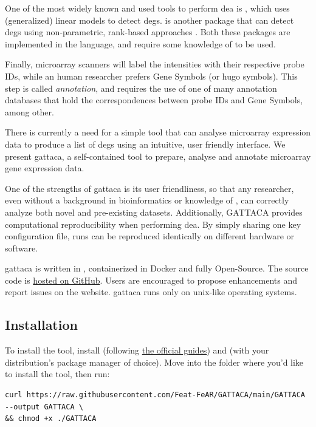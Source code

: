 One of the most widely known and used tools to perform \gls{dea} is , which uses (generalized) linear models to detect \glspl{deg}.  is another package that can detect \glspl{deg} using non-parametric, rank-based approaches \cite{hongRankProdBioconductorPackage2006}. Both these packages are implemented in the  language, and require some knowledge of  to be used.

Finally, microarray scanners will label the intensities with their respective probe IDs, while an human researcher prefers Gene Symbols (or \gls{hugo} symbols). This step is called \textit{annotation}, and requires the use of one of many annotation databases that hold the correspondences between probe IDs and Gene Symbols, among other.

There is currently a need for a simple tool that can analyse microarray expression data to produce a list of \glspl{deg} using an intuitive, user friendly interface. We present \gls{gattaca}, a self-contained tool to prepare, analyse and annotate microarray gene expression data.

One of the strengths of \gls{gattaca} is its user friendliness, so that any researcher, even without a background in bioinformatics or knowledge of , can correctly analyze both novel and pre-existing datasets. Additionally, GATTACA provides computational reproducibility when performing \gls{dea}. By simply sharing one key configuration file, runs can be reproduced identically on different hardware or software.

\gls{gattaca} is written in , containerized in Docker and fully Open-Source. The source code is \href{https://github.com/Feat-FeAR/GATTACA}{hosted on GitHub}. Users are encouraged to propose enhancements and report issues on the website. \gls{gattaca} runs only on unix-like operating systems.

\subsection{Installation}
To install the tool, install  (following \href{https://docs.docker.com/get-docker/}{the official guides}) and  (with your distribution's package manager of choice). Move into the folder where you'd like to install the tool, then run:

\begin{lstlisting}[style=ShellStyle]
curl https://raw.githubusercontent.com/Feat-FeAR/GATTACA/main/GATTACA --output GATTACA \
&& chmod +x ./GATTACA
\end{lstlisting}

